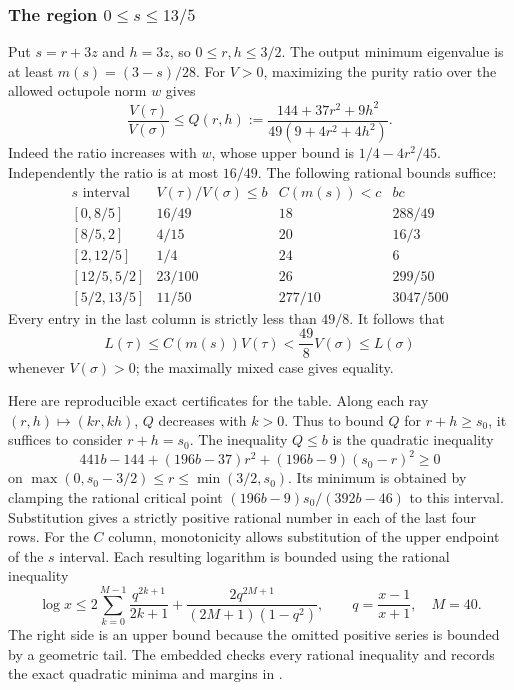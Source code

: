 \documentclass[11pt,a4paper]{article}
\begin{document}
\subsubsection{The region $0\le s\le13/5$}
Put $s=r+3z$ and $h=3z$, so $0\le r,h\le3/2$.
The output minimum eigenvalue is at least $m(s)=(3-s)/28$.
For $V>0$, maximizing the purity ratio over the allowed octupole
norm $w$ gives
\[
 \frac{V(\tau)}{V(\sigma)}
 \le Q(r,h):=\frac{144+37r^2+9h^2}{49(9+4r^2+4h^2)}.
\]
Indeed the ratio increases with $w$, whose upper bound is
$1/4-4r^2/45$. Independently the ratio is at most $16/49$.
The following rational bounds suffice:
\[
\begin{array}{c|c|c|c}
 s\text{ interval}&V(\tau)/V(\sigma)\le b&C(m(s))<c&bc\\\hline
 {[0,8/5]}&16/49&18&288/49\\
 {[8/5,2]}&4/15&20&16/3\\
 {[2,12/5]}&1/4&24&6\\
 {[12/5,5/2]}&23/100&26&299/50\\
 {[5/2,13/5]}&11/50&277/10&3047/500
\end{array}
\]
Every entry in the last column is strictly less than $49/8$.
It follows that
\[
 L(\tau)\le C(m(s))V(\tau)<\frac{49}{8}V(\sigma)\le L(\sigma)
\]
whenever $V(\sigma)>0$; the maximally mixed case gives equality.

Here are reproducible exact certificates for the table. Along each
ray $(r,h)\mapsto(k r,k h)$, $Q$ decreases with $k>0$. Thus to
bound $Q$ for $r+h\ge s_0$, it suffices to consider $r+h=s_0$.
The inequality $Q\le b$ is the quadratic inequality
\[
 441b-144+(196b-37)r^2+(196b-9)(s_0-r)^2\ge0
\]
on $\max(0,s_0-3/2)\le r\le\min(3/2,s_0)$.
Its minimum is obtained by clamping the rational critical point
$(196b-9)s_0/(392b-46)$ to this interval. Substitution gives a
strictly positive rational number in each of the last four rows.
For the $C$ column, monotonicity allows substitution of the upper
endpoint of the $s$ interval. Each resulting logarithm is bounded
using the rational inequality
\[
 \log x\le 2\sum_{k=0}^{M-1}\frac{q^{2k+1}}{2k+1}
          +\frac{2q^{2M+1}}{(2M+1)(1-q^2)},
 \qquad q=\frac{x-1}{x+1},\quad M=40.
\]
The right side is an upper bound because the omitted positive
series is bounded by a geometric tail. The embedded  checks every rational inequality
and records the exact quadratic minima and margins in
.
\end{document}
